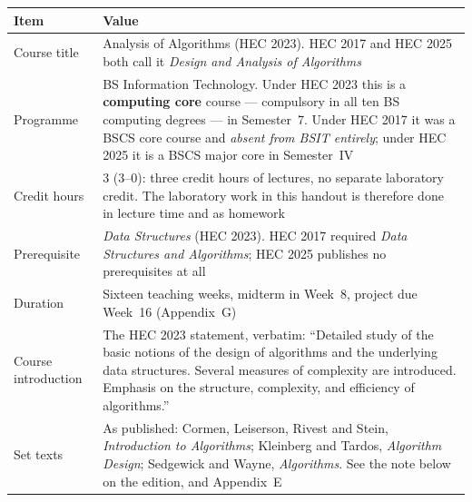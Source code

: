 \begin{longtable}{@{}L{4.2cm}L{11.0cm}@{}}
\toprule
{}
\textbf{Item} & \textbf{Value} \\
\midrule
\endhead
Course title & Analysis of Algorithms (HEC 2023). HEC 2017 and HEC 2025 both
call it \emph{Design and Analysis of Algorithms} \\
Programme & BS Information Technology. Under HEC 2023 this is a
\textbf{computing core} course --- compulsory in all ten BS computing degrees
--- in Semester~7. Under HEC 2017 it was a BSCS core course and
\emph{absent from BSIT entirely}; under HEC 2025 it is a BSCS major core in
Semester~IV \\
Credit hours & 3 (3--0): three credit hours of lectures, no separate laboratory
credit. The laboratory work in this handout is therefore done in lecture time
and as homework \\
Prerequisite & \emph{Data Structures} (HEC 2023). HEC 2017 required
\emph{Data Structures and Algorithms}; HEC 2025 publishes no prerequisites at
all \\
Duration & Sixteen teaching weeks, midterm in Week~8, project due Week~16
(Appendix~G) \\
Course introduction & The HEC 2023 statement, verbatim: ``Detailed study of the
basic notions of the design of algorithms and the underlying data structures.
Several measures of complexity are introduced. Emphasis on the structure,
complexity, and efficiency of algorithms.'' \\
Set texts & As published: Cormen, Leiserson, Rivest and Stein,
\emph{Introduction to Algorithms}; Kleinberg and Tardos, \emph{Algorithm
Design}; Sedgewick and Wayne, \emph{Algorithms}. See the note below on the
edition, and Appendix~E \\
\bottomrule
\end{longtable}

